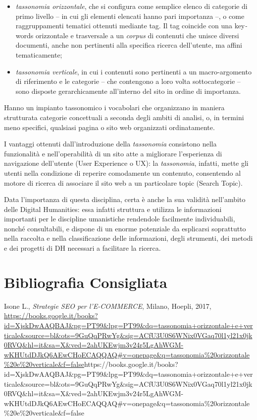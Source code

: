 {\begin{itemize}
\item
  \emph{tassonomia orizzontale}, che si configura come semplice elenco
  di categorie di primo livello -- in cui gli elementi elencati hanno
  pari importanza --, o come raggruppamenti tematici ottenuti mediante
  tag. Il tag coincide con una key\emph{-}words orizzontale e
  trasversale a un \emph{corpus} di contenuti che unisce diversi
  documenti, anche non pertinenti alla specifica ricerca dell'utente, ma
  affini tematicamente;
\item
  \emph{tassonomia verticale}, in cui i contenuti sono pertinenti a un
  macro-argomento di riferimento e le categorie -- che contengono a loro
  volta sottocategorie -- sono disposte gerarchicamente all'interno del
  sito in ordine di importanza.
\end{itemize}

Hanno un impianto tassonomico i vocabolari che organizzano in maniera
strutturata categorie concettuali a seconda degli ambiti di analisi, o,
in termini meno specifici, qualsiasi pagina o sito web organizzati
ordinatamente.

I vantaggi ottenuti dall'introduzione della \emph{tassonomia} consistono
nella funzionalità e nell'operabilità di un sito atte a migliorare
l'esperienza di navigazione dell'utente (User Experience o UX): la
\emph{tassonomia}, infatti, mette gli utenti nella condizione di
reperire comodamente un contenuto, consentendo al motore di ricerca di
associare il sito web a un particolare topic (Search Topic).

Data l'importanza di questa disciplina, certa è anche la sua validità
nell'ambito delle Digital Humanities: essa infatti struttura e utilizza
le informazioni importanti per le discipline umanistiche rendendole
facilmente individuabili, nonché consultabili, e dispone di un enorme
potenziale da esplicarsi soprattutto nella raccolta e nella
classificazione delle informazioni, degli strumenti, dei metodi e dei
progetti di DH necessari a facilitare la ricerca.

\section*{Bibliografia Consigliata}
{\parindent0pt 
Isone L., \emph{Strategie SEO per l'E-COMMERCE}, Milano, Hoepli, 2017,
\url{https://books.google.it/books?id=XjskDwAAQBAJ\&pg=PT99\&lpg=PT99\&dq=tassonomia+orizzontale+e+verticale\&source=bl\&ots=9GuQqPRwYg\&sig=ACfU3U0S6WNix0VGaq70l1yl21x0jk0RVQ\&hl=it\&sa=X\&ved=2ahUKEwjm3v24r5LgAhWGM-wKHUtdDJkQ6AEwCHoECAQQAQ\#v=onepage\&q=tassonomia\%20orizzontale\%20e\%20verticale\&f=false}{https://books.google.it/books?id=XjskDwAAQBAJ\&pg=PT99\&lpg=PT99\&dq=tassonomia+orizzontale+e+verticale\&source=bl\&ots=9GuQqPRwYg\&sig=ACfU3U0S6WNix0VGaq70l1yl21x0jk0RVQ\&hl=it\&sa=X\&ved=2ahUKEwjm3v24r5LgAhWGM-wKHUtdDJkQ6AEwCHoECAQQAQ\#v=onepage\&q=tassonomia\%20orizzontale\%20e\%20verticale\&f=false}
}

}
